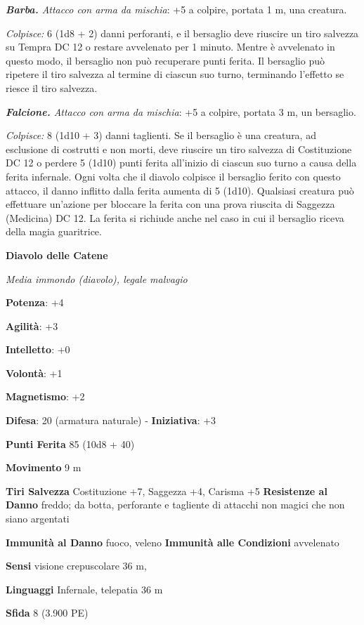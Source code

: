\begin{multicols}{2}
\emph{\textbf{Barba.} Attacco con arma da mischia}: +5 a colpire,
portata 1 m, una creatura.

\emph{Colpisce:} 6 (1d8 + 2) danni perforanti, e il bersaglio deve
riuscire un tiro salvezza su Tempra DC 12 o restare avvelenato per
1 minuto. Mentre è avvelenato in questo modo, il bersaglio non può
recuperare punti ferita. Il bersaglio può ripetere il tiro salvezza al
termine di ciascun suo turno, terminando l'effetto se riesce il tiro
salvezza.

\emph{\textbf{Falcione.} Attacco con arma da mischia}: +5 a colpire,
portata 3 m, un bersaglio.

\emph{Colpisce:} 8 (1d10 + 3) danni taglienti. Se il bersaglio è una
creatura, ad esclusione di costrutti e non morti, deve riuscire un tiro
salvezza di Costituzione DC 12 o perdere 5 (1d10) punti ferita
all'inizio di ciascun suo turno a causa della ferita infernale. Ogni
volta che il diavolo colpisce il bersaglio ferito con questo attacco, il
danno inflitto dalla ferita aumenta di 5 (1d10). Qualsiasi creatura può
effettuare un'azione per bloccare la ferita con una prova riuscita di
Saggezza (Medicina) DC 12. La ferita si richiude anche nel caso in cui
il bersaglio riceva della magia guaritrice.



\textbf{Diavolo delle Catene}

\emph{Media immondo (diavolo), legale malvagio}

\textbf{Potenza}: +4

\textbf{Agilità}: +3

\textbf{Intelletto}: +0

\textbf{Volontà}: +1

\textbf{Magnetismo}: +2

\textbf{Difesa}: 20 (armatura naturale) - \textbf{Iniziativa}: +3

\textbf{Punti Ferita} 85 (10d8 + 40)

\textbf{Movimento} 9 m

\textbf{Tiri Salvezza} Costituzione +7, Saggezza +4, Carisma +5
\textbf{Resistenze al Danno} freddo; da botta, perforante e tagliente
di attacchi non magici che non siano argentati

\textbf{Immunità al Danno} fuoco, veleno \textbf{Immunità alle
Condizioni} avvelenato

\textbf{Sensi} visione crepuscolare 36 m, 

\textbf{Linguaggi} Infernale, telepatia 36 m 

\textbf{Sfida} 8 (3.900 PE)\smallskip


\end{multicols}
